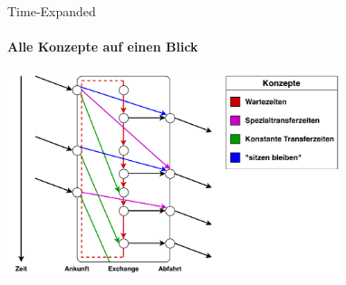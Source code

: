 \begin{frame}{Time-Expanded}
	\framesubtitle{Alle Konzepte auf einen Blick}
	\begin{center}
		\includegraphics[height=6cm]{images/time-expanded/overview.pdf} 
	\end{center}
\end{frame}
